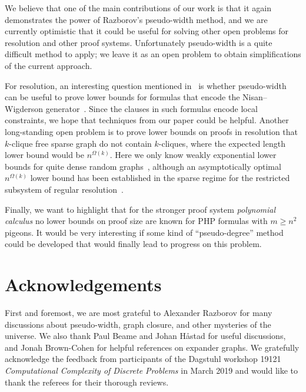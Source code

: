 \documentclass{article}
\newcommand{\bigomega}[1]{\Omega ( #1 )}
\newcommand{\introduceterm}[1]{{\emph{#1}}}
\newcommand{\pseudowidth}{pseudo-width\xspace}
\numberwithin{equation}{section}
\begin{document}
We believe that one of the main contributions of our work is that it
again demonstrates the power of Razborov's \pseudowidth method, and we
are currently optimistic that it could be useful for solving other
open problems for resolution and other proof systems. Unfortunately
\pseudowidth is a quite difficult method to apply; we leave it as an
open problem to obtain simplifications of the current approach.



For resolution, an interesting question mentioned
in~\cite{Razborov04ResolutionLowerBoundsPM} is whether \pseudowidth
can be useful to prove lower bounds for formulas that encode the
Nisan--Wigderson generator~\cite{ABRW04Pseudorandom,Razborov15PseudorandomGeneratorsHard}.
Since the clauses in such formulas encode local constraints, we hope
that techniques from our paper could 
be helpful.
Another long-standing open problem is to prove lower bounds on proofs
in resolution that
\mbox{$k$-clique} free sparse graph
do not contain
\mbox{$k$-cliques}, where the expected length lower bound would be
$n^{\bigomega{k}}$.
Here we only know weakly exponential lower bounds for quite dense
random  graphs~\cite{BIS07IndependentSets,Pang21},
although an asymptotically optimal
$n^{\bigomega{k}}$ lower bound 
has been
established in the sparse
regime for the restricted subsystem of regular 
resolution~\cite{ABdRLNR18Clique}.

Finally, we want to highlight that for the stronger proof system
\introduceterm{polynomial calculus}
\cite{ABRW02SpaceComplexity,CEI96Groebner}
no lower bounds on proof size are known for PHP formulas with
$m \geq n^2$ pigeons. It would be very interesting if some kind of
``pseudo-degree'' method could be developed that would finally lead to
progress on this problem.


 
\section*{Acknowledgements}

First and foremost, we are most grateful to Alexander Razborov for
many discussions about \pseudowidth, graph closure, and other
mysteries of the universe. We also thank Paul Beame and Johan Håstad
for useful discussions, and Jonah Brown-Cohen for helpful references
on expander graphs. We gratefully acknowledge the feedback from
participants of the Dagstuhl workshop 19121 \emph{Computational
  Complexity of Discrete Problems} in March 2019 and would like to
thank the referees for their thorough reviews.



\end{document}
